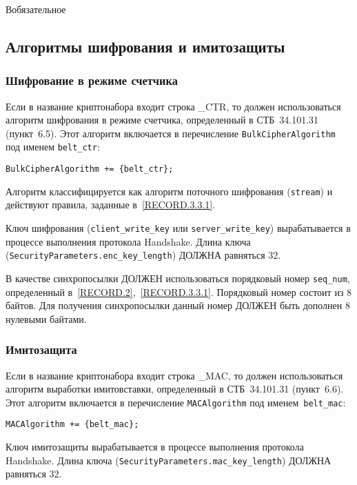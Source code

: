 \begin{appendix}{В}{обязательное}
\label{BSUITES.2}

\subsection{Алгоритмы шифрования и имитозащиты}\label{BSUITES.2.1}

\subsubsection{Шифрование в режиме счетчика}\label{BSUITES.2.1.1}

Если в название криптонабора входит строка \_CTR, то должен использоваться 
алгоритм шифрования в режиме счетчика, определенный в СТБ~34.101.31 
(пункт~6.5). Этот алгоритм включается в перечисление 
\lstinline{BulkCipherAlgorithm} под именем \lstinline{belt_ctr}: 
\begin{lstlisting}
BulkCipherAlgorithm += {belt_ctr};
\end{lstlisting}

Алгоритм классифицируется как алгоритм поточного шифрования (\lstinline{stream}) 
и действуют правила, заданные в~\ref{RECORD.3.3.1}.  

Ключ шифрования (\lstinline{client_write_key} или
\lstinline{server_write_key}) вырабатывается в процессе выполнения
протокола Handshake. Длина ключа
(\mbox{\lstinline{SecurityParameters.enc_key_length}}) ДОЛЖНА равняться 32.

В качестве синхропосылки ДОЛЖЕН использоваться порядковый номер
\lstinline{seq_num}, определенный в~\ref{RECORD.2},~\ref{RECORD.3.3.1}.
Порядковый номер состоит из 8 байтов. Для получения синхропосылки данный
номер ДОЛЖЕН быть дополнен 8 нулевыми байтами.

\subsubsection{Имитозащита}\label{BSUITES.2.1.2}

Если в название криптонабора входит строка \_MAC, то должен использоваться
алгоритм выработки имитовставки, определенный в СТБ~34.101.31 (пункт~6.6).
Этот алгоритм включается в перечисление \lstinline{MACAlgorithm} под 
именем~\lstinline{belt_mac}:
\begin{lstlisting}
MACAlgorithm += {belt_mac};
\end{lstlisting}

Ключ имитозащиты вырабатывается в процессе выполнения протокола
Handshake. Длина ключа
(\lstinline{SecurityParameters.mac_key_length}) ДОЛЖНА равняться 32.


\end{appendix}
